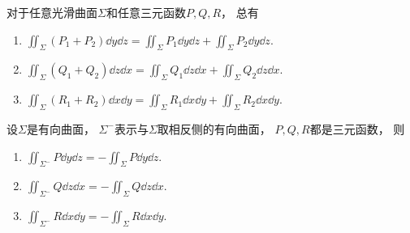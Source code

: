 \begin{property}
对于任意光滑曲面\(\Sigma\)和任意三元函数\(P,Q,R\)，
总有\begin{enumerate}
	\item \(\iint_\Sigma (P_1 + P_2) \dd{y}\dd{z}
	= \iint_\Sigma P_1 \dd{y}\dd{z}
	+ \iint_\Sigma P_2 \dd{y}\dd{z}\).

	\item \(\iint_\Sigma (Q_1 + Q_2) \dd{z}\dd{x}
	= \iint_\Sigma Q_1 \dd{z}\dd{x}
	+ \iint_\Sigma Q_2 \dd{z}\dd{x}\).

	\item \(\iint_\Sigma (R_1 + R_2) \dd{x}\dd{y}
	= \iint_\Sigma R_1 \dd{x}\dd{y}
	+ \iint_\Sigma R_2 \dd{x}\dd{y}\).
\end{enumerate}
\end{property}

\begin{property}
设\(\Sigma\)是有向曲面，
\(\Sigma^-\)表示与\(\Sigma\)取相反侧的有向曲面，
\(P,Q,R\)都是三元函数，
则\begin{enumerate}
	\item \(\iint_{\Sigma^-} P \dd{y}\dd{z}
	= -\iint_\Sigma P \dd{y}\dd{z}\).

	\item \(\iint_{\Sigma^-} Q \dd{z}\dd{x}
	= -\iint_\Sigma Q \dd{z}\dd{x}\).

	\item \(\iint_{\Sigma^-} R \dd{x}\dd{y}
	= -\iint_\Sigma R \dd{x}\dd{y}\).
\end{enumerate}
\end{property}

